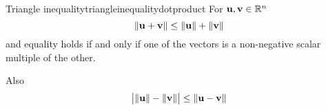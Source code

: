 \begin{theorem}{Triangle inequality}{triangleinequalitydotproduct}
  For ${\bf u},{\bf v}\in \mathbb{R}^{n}$
\begin{equation}
\| {\bf u}+{\bf v}\| \leq \| {\bf u}\| +\| {\bf v}
\|  \label{triangleineq1}
\end{equation}
and equality holds if and only if one of the vectors is a non-negative scalar
multiple of the other. 

Also
\begin{equation}
\big| \| {\bf u}\| -\| {\bf v}\| \big| \leq
\| {\bf u}-{\bf v}\|  \label{triangleineq2}
\end{equation}
\end{theorem}

